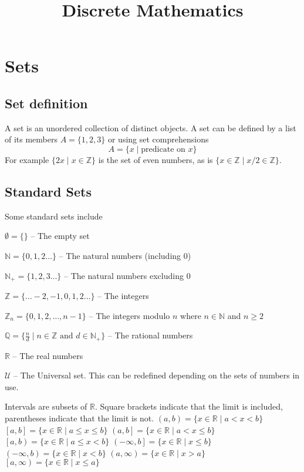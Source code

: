 \documentclass[10pt]{article}
\date{}\author{}
\title{Discrete Mathematics}
\begin{document}
\twocolumn\maketitle
\tableofcontents
\section{Sets}
\subsection{Set definition}
A set is an unordered collection of distinct objects.  A set can be defined by a list of its members $A=\{1,2,3\}$ or using set comprehensions \[A=\{x\mid \text{predicate on $x$}\}\]For example $\{2x\mid x\in\mathbb Z\}$ is the set of even numbers, as is $\{x\in\mathbb Z\mid x/2\in\mathbb Z\}$.
\subsection{Standard Sets}
Some standard sets include
\begin{enumerate*}
\item$\emptyset=\{\}$ -- The empty set
\item$\mathbb{N}=\{0,1,2\ldots\}$ -- The natural numbers (including 0)
\item$\mathbb N_+=\{1,2,3\ldots\}$ -- The natural numbers excluding 0
\item$\mathbb Z=\{\ldots-2,-1,0,1,2\ldots\}$ -- The integers
\item$\mathbb Z_n=\{0,1,2,\ldots,n-1\}$ -- The integers modulo $n$ where $n\in\mathbb N$ and $n\ge2$
\item$\mathbb Q=\{\frac nd \mid n\in\mathbb Z\text{ and }d\in\mathbb N_+\}$ -- The rational numbers
\item$\mathbb R$ -- The real numbers
\item$\mathcal U$ -- The Universal set.  This can be redefined depending on the sets of numbers in use.
\item Intervals are subsets of $\mathbb R$.  Square brackets indicate that the limit is included, parentheses indicate that the limit is not.
\subitem $(a,b)=\{x\in\mathbb R\mid a<x<b\}$
\subitem $\left[a,b\right]=\{x\in\mathbb R\mid a\le x\le b\}$
\subitem $\left(a,b\right]=\{x\in\mathbb R\mid a< x\le b\}$
\subitem $\left[a,b\right)=\{x\in\mathbb R\mid a\le x< b\}$
\subitem $\left(-\infty,b\right]=\{x\in\mathbb R\mid x\le b\}$
\subitem $\left(-\infty,b\right)=\{x\in\mathbb R\mid x< b\}$
\subitem $\left(a,\infty\right)=\{x\in\mathbb R\mid x>a\}$
\subitem $\left[a,\infty\right)=\{x\in\mathbb R\mid x\le a\}$
\end{enumerate*}
\end{document}
